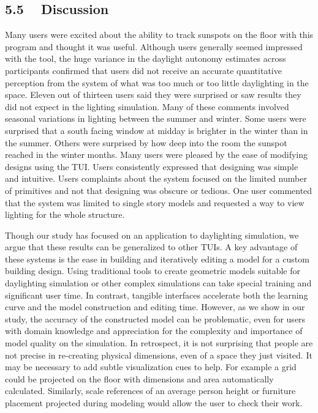 \documentclass{article}
\begin{document}
\subsection{5.5 ~ Discussion}

Many users were excited about the ability to track sunspots on the
floor with this program and thought it was useful.  Although users
generally seemed impressed with the tool, the huge variance in the
daylight autonomy estimates across participants confirmed that users
did not receive an accurate quantitative perception from the system of
what was too much or too little daylighting in the space.
%
Eleven out of thirteen users said they were surprised or saw results
they did not expect in the lighting simulation.  Many of these
comments involved seasonal variations in lighting between the summer
and winter.  Some users were surprised that a south facing window at
midday is brighter in the winter than in the summer.  Others were
surprised by how deep into the room the sunspot reached in the winter
months.
%
Many users were pleased by the ease of modifying designs using the
TUI.  Users consistently expressed that designing was simple and
intuitive.  Users complaints about the system focused on the limited
number of primitives and not that designing was obscure or tedious.
One user commented that the system was limited to single story models
and requested a way to view lighting for the whole structure.


Though our study has focused on an application to daylighting
simulation, we argue that these results can be generalized to other
TUIs.  A key advantage of these systems is the ease in building and
iteratively editing a model for a custom building design.  Using
traditional tools to create geometric models suitable for daylighting
simulation or other complex simulations can take special training and
significant user time.  In contrast, tangible interfaces accelerate
both the learning curve and the model construction and editing time.
However, as we show in our study, the accuracy of the constructed
model can be problematic, even for users with domain knowledge and
appreciation for the complexity and importance of model quality on the
simulation.  
%
In retrospect, it is not surprising that people are not precise in
re-creating physical dimensions, even of a space they just visited.
It may be necessary to add subtle visualization cues to help.  For
example a grid could be projected on the floor with dimensions and
area automatically calculated.  Similarly, scale references of an
average person height or furniture placement projected during modeling
would allow the user to check their work.
\end{document}
